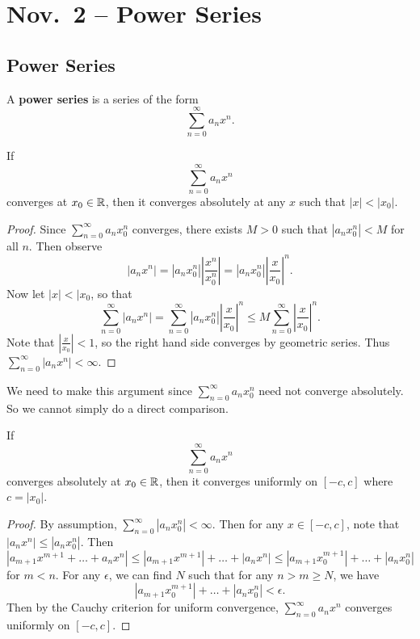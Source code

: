 \chapter{Nov.~2 -- Power Series}

\section{Power Series}

\begin{definition}
  A \textbf{power series} is a series of the form
  \[\sum_{n = 0}^\infty a_n x^n.\]
\end{definition}

\begin{theorem}
  If \[\sum_{n = 0}^\infty a_n x^n\] converges at
  $x_0 \in \mathbb{R}$,
  then it converges absolutely at any $x$ such that
  $|x| < |x_0|$.
\end{theorem}

\begin{proof}
  Since $\sum_{n = 0}^\infty a_n x_0^n$ converges,
  there exists $M > 0$ such that $|a_nx_0^n| < M$
  for all $n$. Then observe
  \[
    |a_nx^n| = |a_nx_0^n| \left|\frac{x^n}{x_0^n}\right|
    = |a_nx_0^n| \left|\frac{x}{x_0}\right|^n.
  \]
  Now let $|x| < |x_0$, so that
  \[
    \sum_{n = 0}^\infty |a_n x^n| = \sum_{n = 0}^\infty |a_n x_0^n|\left|\frac{x}{x_0}\right|^n
    \le M \sum_{n = 0}^\infty \left|\frac{x}{x_0}\right|^n.
  \]
  Note that $\left|\frac{x}{x_0}\right| < 1$, so the
  right hand side converges by geometric series.
  Thus $\sum_{n = 0}^\infty |a_n x^n| < \infty$.
\end{proof}

\begin{remark}
  We need to make this argument since $\sum_{n = 0}^\infty a_n x_0^n$
  need not converge absolutely. So we cannot simply do a
  direct comparison.
\end{remark}

\begin{theorem}
  If \[\sum_{n = 0}^\infty a_n x^n\] converges absolutely
  at $x_0 \in \mathbb{R}$, then it converges uniformly on
  $[-c, c]$ where $c = |x_0|$.
\end{theorem}

\begin{proof}
  By assumption, $\sum_{n = 0}^\infty |a_n x_0^n| < \infty$.
  Then for any $x \in [-c, c]$, note that
  $|a_nx^n| \le |a_nx_0^n|$. Then
  \[
    |a_{m + 1} x^{m + 1} + \dots + a_nx^n|
    \le |a_{m + 1} x^{m + 1}| + \dots + |a_nx^n|
    \le |a_{m + 1} x_0^{m + 1}| + \dots + |a_nx_0^n|
  \]
  for $m < n$. For any $\epsilon$, we can find $N$
  such that for any $n > m \ge N$, we have
  \[|a_{m + 1}x_0^{m + 1}| + \dots + |a_nx_0^n| < \epsilon.\]
  Then by the Cauchy criterion for uniform convergence,
  $\sum_{n = 0}^\infty a_n x^n$ converges uniformly on
  $[-c, c]$.
\end{proof}

